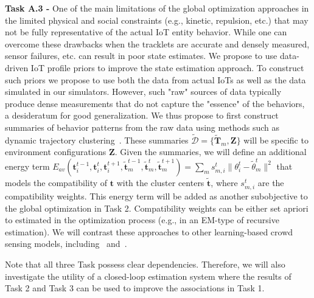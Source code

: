{\bf Task A.3 -}  One of the main limitations of the global optimization approaches in the limited physical and social constraints (e.g., kinetic, repulsion, etc.) that may not be fully representative of the actual IoT entity behavior.  While one can overcome these drawbacks when the tracklets are accurate and densely measured, sensor failures, etc. can result in poor state estimates.  We propose to use data-driven IoT profile priors to improve the state estimation approach.  To construct such priors we propose to use both the data from actual IoTs as well as the data simulated in our simulators.  However, such "raw" sources of data typically produce dense measurements that do not capture the "essence" of the behaviors, a desideratum for good generalization.  We thus propose to first construct summaries of behavior patterns from the raw data using methods such as dynamic trajectory clustering~\cite{johnson1996,morris2011,zhou2011,cancela2014,xu2015}.  These summaries $\mathcal{\tilde{D}} = \{ \mathbf{\tilde{T}}_{m}, \mathbf{Z} \}$ will be specific to environment configurations $\mathbf{Z}$.  Given the summaries, we will define an additional energy term $E_{av} (\mathbf{t}_{i}^{t-1}, \mathbf{t}_{i}^{t}, \mathbf{t}_{i}^{t+1}, \mathbf{\tilde{t}}_{m}^{t-1}, \mathbf{\tilde{t}}_{m}^{t}, \mathbf{\tilde{t}}_{m}^{t+1}) = \sum_m s_{m,i}^t \| \theta_{i}^{t} - \tilde{\theta}_{m}^{t} \|^{2}$ that models the compatibility of $\mathbf{t}$ with the cluster centers $\mathbf{\tilde{t}}$, where $s_{m,i}^t$ are the compatibility weights.  This energy term will be added as another subobjective to the global optimization in Task 2. Compatibility weights can be either set apriori to estimated in the optimization process (e.g., in an EM-type of recursive estimation).  We will contrast these approaches to other learning-based crowd sensing models, including~\cite{zhou2012} and~\cite{bera2015}. 

Note that all three Task possess clear dependencies.  Therefore, we will also investigate the utility of a closed-loop estimation system where the results of Task 2 and Task 3 can be used to improve the associations in Task 1.
 

